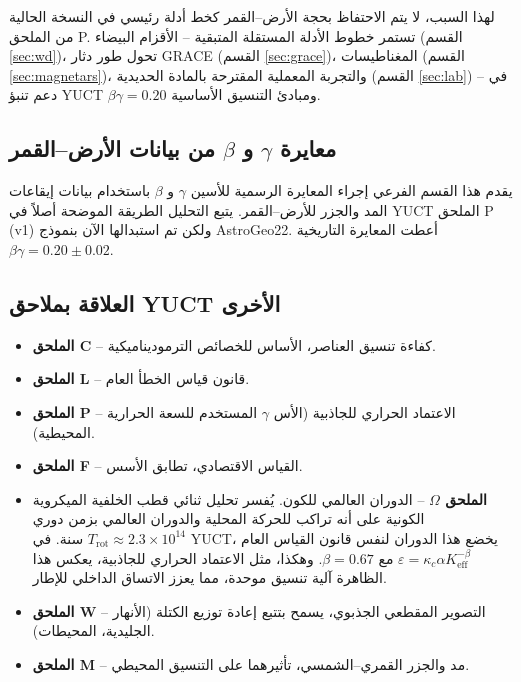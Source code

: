 \documentclass[11pt,a4paper]{article}
\begin{document}
	لهذا السبب، لا يتم الاحتفاظ بحجة الأرض–القمر كخط أدلة رئيسي في النسخة الحالية من الملحق P. تستمر خطوط الأدلة المستقلة المتبقية – الأقزام البيضاء (القسم \ref{sec:wd})، تحول طور دثار GRACE (القسم \ref{sec:grace})، المغناطيسات (القسم \ref{sec:magnetars})، والتجربة المعملية المقترحة بالمادة الحديدية (القسم \ref{sec:lab}) – في دعم تنبؤ YUCT $\beta\gamma = 0.20$ ومبادئ التنسيق الأساسية.
	
	\subsection{معايرة $\gamma$ و $\beta$ من بيانات الأرض–القمر}\label{subsec:earth-moon-calibration}
	يقدم هذا القسم الفرعي إجراء المعايرة الرسمية للأسين $\gamma$ و $\beta$ باستخدام بيانات إيقاعات المد والجزر للأرض–القمر. يتبع التحليل الطريقة الموضحة أصلاً في YUCT الملحق P (v1) ولكن تم استبدالها الآن بنموذج AstroGeo22. أعطت المعايرة التاريخية $\beta\gamma = 0.20 \pm 0.02$.
	
	\subsection{العلاقة بملاحق YUCT الأخرى}
	
	\begin{itemize}
		\item \textbf{الملحق C} – كفاءة تنسيق العناصر، الأساس للخصائص الترموديناميكية.
		\item \textbf{الملحق L} – قانون قياس الخطأ العام.
		\item \textbf{الملحق P} – الاعتماد الحراري للجاذبية (الأس $\gamma$ المستخدم للسعة الحرارية المحيطية).
		\item \textbf{الملحق F} – القياس الاقتصادي، تطابق الأسس.
		\item \textbf{الملحق $\Omega$} – الدوران العالمي للكون. يُفسر تحليل ثنائي قطب الخلفية الميكروية الكونية على أنه تراكب للحركة المحلية والدوران العالمي بزمن دوري $T_{\mathrm{rot}} \approx 2.3\times10^{14}$ سنة. في YUCT، يخضع هذا الدوران لنفس قانون القياس العام $\varepsilon = \kappa_c \alpha K_{\mathrm{eff}}^{-\beta}$ مع $\beta = 0.67$. وهكذا، مثل الاعتماد الحراري للجاذبية، يعكس هذا الظاهرة آلية تنسيق موحدة، مما يعزز الاتساق الداخلي للإطار.
		\item \textbf{الملحق W} – التصوير المقطعي الجذبوي، يسمح بتتبع إعادة توزيع الكتلة (الأنهار الجليدية، المحيطات).
		\item \textbf{الملحق M} – مد والجزر القمري–الشمسي، تأثيرهما على التنسيق المحيطي.
	\end{itemize}
	
\end{document}
